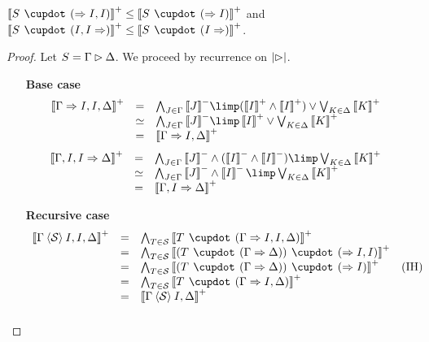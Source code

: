 \begin{lemma}[Contraction]
  $\psint{S \mix (\seq I, I)} \sement \psint{S \mix (\seq I)}$ and
  $\psint{S \mix (I, I \seq)} \sement \psint{S \mix (I \seq)}$.
\end{lemma}
\begin{proof}
  Let $S = \Gamma \mathbin{\rhd} \Delta$. We proceed by recurrence on $\left|\mathbin{\rhd}\right|$.
  \begin{itemize}
    \item[\textbf{Base case}]
    $$
    \begin{array}{rcll}
      \psint{\Gamma \seq I, I, \Delta}
      &=& \bigwedge_{J \in \Gamma}{\nsint{J}} \limp (\psint{I} \land \psint{I}) \vee \bigvee_{K \in \Delta}{\psint{K}} & \\
      &\semequiv& \bigwedge_{J \in \Gamma}{\nsint{J}} \limp \psint{I} \vee \bigvee_{K \in \Delta}{\psint{K}} & \\
      &=& \psint{\Gamma \seq I, \Delta} & \\
    \end{array}
    $$
    $$
    \begin{array}{rcll}
      \psint{\Gamma, I, I \seq \Delta}
      &=& \bigwedge_{J \in \Gamma}{\nsint{J}} \land (\nsint{I} \land \nsint{I}) \limp \bigvee_{K \in \Delta}{\psint{K}} & \\
      &\semequiv& \bigwedge_{J \in \Gamma}{\nsint{J}} \land \nsint{I} \limp \bigvee_{K \in \Delta}{\psint{K}} & \\
      &=& \psint{\Gamma, I \seq \Delta} & \\
    \end{array}
    $$
    \item[\textbf{Recursive case}]
    $$
    \begin{array}{rcll}
      \psint{\Gamma \piq{\mathcal{S}} I, I, \Delta}
      &=& \bigwedge_{T \in \mathcal{S}}{\psint{T \mix (\Gamma \seq I, I, \Delta)}} & \\
      &=& \bigwedge_{T \in \mathcal{S}}{\psint{(T \mix (\Gamma \seq \Delta)) \mix (\seq I, I)}} & \\
      &=& \bigwedge_{T \in \mathcal{S}}{\psint{(T \mix (\Gamma \seq \Delta)) \mix (\seq I)}} &\text{(IH)} \\
      &=& \bigwedge_{T \in \mathcal{S}}{\psint{T \mix (\Gamma \seq I, \Delta)}} & \\
      &=& \psint{\Gamma \piq{\mathcal{S}} I, \Delta} & \\
    \end{array}
    $$
    $$
$$
\end{itemize}
\end{proof}

